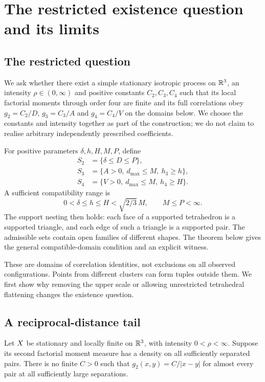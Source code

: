 \section{The restricted existence question and its limits}
\label{sec:obstructions}

\subsection{The restricted question}


We ask whether there exist a simple stationary isotropic process on $\mathbb R^3$, an intensity $\rho\in(0,\infty)$ and positive constants $C_2,C_3,C_4$ such that its local factorial moments through order four are finite and its full correlations obey $g_2=C_2/D$, $g_3=C_3/A$ and $g_4=C_4/V$ on the domains below. We choose the constants and intensity together as part of the construction; we do not claim to realise arbitrary independently prescribed coefficients.

For positive parameters $\delta,h,H,M,P$, define
\begin{align*}
 S_2&=\{\delta\leq D\leq P\},\\
 S_3&=\{A>0,\ d_{\max}\leq M,\ h_3\geq h\},\\
 S_4&=\{V>0,\ d_{\max}\leq M,\ h_4\geq H\}.
\end{align*}
A sufficient compatibility range is
\begin{equation}
 0<\delta\leq h\leq H<\sqrt{2/3}\,M,\qquad M\leq P<\infty.
 \label{eq:parameter-range}
\end{equation}
The support nesting then holds: each face of a supported tetrahedron is a supported triangle, and each edge of such a triangle is a supported pair. The admissible sets contain open families of different shapes. The theorem below gives the general compatible-domain condition and an explicit witness.

These are domains of correlation identities, not exclusions on all observed configurations. Points from different clusters can form tuples outside them. We first show why removing the upper scale or allowing unrestricted tetrahedral flattening changes the existence question.

\subsection{A reciprocal-distance tail}

\begin{proposition}
\label{prop:pair-tail}
Let $X$ be stationary and locally finite on $\mathbb R^3$, with intensity $0<\rho<\infty$. Suppose its second factorial moment measure has a density on all sufficiently separated pairs. There is no finite $C>0$ such that $g_2(x,y)=C/|x-y|$ for almost every pair at all sufficiently large separations.
\end{proposition}


